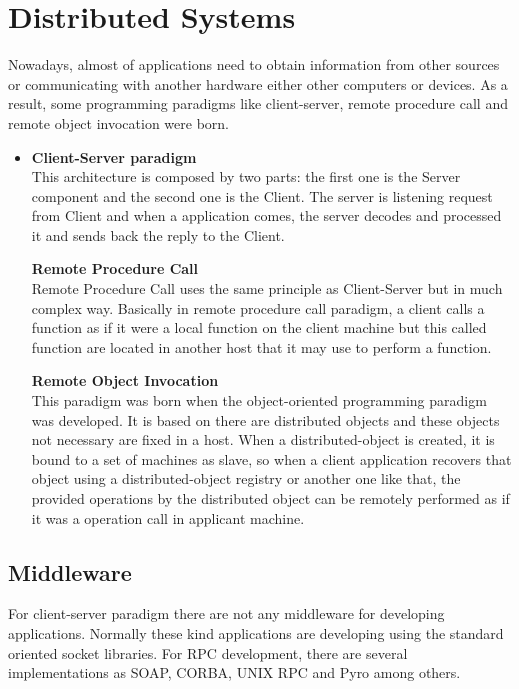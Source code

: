 \section{Distributed Systems}
Nowadays, almost of applications need to obtain information from other sources
or communicating with another hardware either other computers or devices. As a
result, some programming paradigms like client-server, remote procedure call and
remote object invocation were born.
\begin{itemize}
\item \textbf{Client-Server paradigm}~\\
This architecture is composed by two parts: the first one is the Server
component and the second one is the Client. The server is listening request from
Client and when a application comes, the server decodes and processed it and
sends back the reply to the Client.

\textbf{Remote Procedure Call}~\\
Remote Procedure Call uses the same principle as Client-Server but in much
complex way. Basically in remote procedure call paradigm, a client calls a
function as if it were a local function on the client machine but this called
function are located in another host that it may use to perform a function.

\textbf{Remote Object Invocation}~\\
This paradigm was born when the object-oriented programming paradigm was
developed. It is based on there are distributed objects and these objects not
necessary are fixed in a host. When a distributed-object is created, it is
bound to a set of machines as slave, so when a client application recovers that
object using a distributed-object registry or another one like that, the
provided operations by the distributed object can be remotely performed as if
it was a  operation call in applicant machine.
\end{itemize}
\subsection{Middleware}

For client-server paradigm there are not any middleware for developing
applications. Normally these kind applications are developing using the standard
oriented socket libraries.
For \ac{RPC} development, there are several implementations as
\ac{SOAP}, \ac{CORBA}, UNIX \ac{RPC} and Pyro among others.

